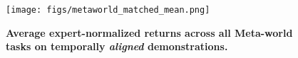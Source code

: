 \begin{figure}
    \centering
    \texttt{[image: figs/metaworld\_matched\_mean.png]}
    \vskip -0.05in
    \caption{\small \textbf{Average expert-normalized returns across all Meta-world tasks on temporally \textit{aligned} demonstrations.}
    }
    \label{fig:meta_aligned_bar}
\end{figure}
